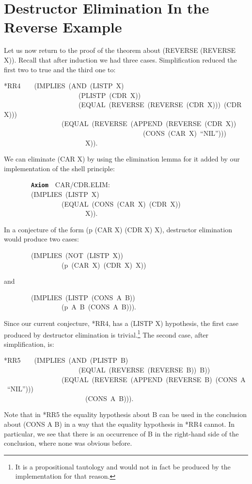 \documentclass[11pt]{book}
\newenvironment{pubasis}{\begin{flushleft}\ttfamily\small}{\normalsize\rmfamily\end{flushleft}}
\newcommand{\axiomordefinition}[1]{\vspace{6pt}\texttt{\textbf{#1}}}
\newcommand{\pubdefaulttextsize}{\large}
\begin{document}
\section{Destructor Elimination In the Reverse Example}
\pubdefaulttextsize
Let us now return to the proof of the theorem about (REVERSE (REVERSE X)).
Recall that after induction we had three cases.  Simplification reduced
the first two to true and the third one to:
\begin{pubasis}
*RR4~~~~(IMPLIES~(AND~(LISTP~X)\\
~~~~~~~~~~~~~~~~~~~~~~(PLISTP~(CDR~X))\\
~~~~~~~~~~~~~~~~~~~~~~(EQUAL~(REVERSE~(REVERSE~(CDR~X)))~(CDR~X)))\\
~~~~~~~~~~~~~~~~~(EQUAL~(REVERSE~(APPEND~(REVERSE~(CDR~X))\\
~~~~~~~~~~~~~~~~~~~~~~~~~~~~~~~~~~~~~~~~~(CONS~(CAR~X)~``NIL'')))\\
~~~~~~~~~~~~~~~~~~~~~~~~X)).\\
\end{pubasis}
We can eliminate (CAR X) by using the elimination lemma
for it added by our implementation of the shell principle:
\begin{pubasis}
~~~~~~~~\axiomordefinition{Axiom}~~CAR/CDR.ELIM:\\
~~~~~~~~(IMPLIES~(LISTP~X)\\
~~~~~~~~~~~~~~~~~(EQUAL~(CONS~(CAR~X)~(CDR~X))\\
~~~~~~~~~~~~~~~~~~~~~~~~X)).\\
\end{pubasis}
In a conjecture of the form (p (CAR X) (CDR X) X), destructor elimination
would produce two cases:
\begin{pubasis}
~~~~~~~~(IMPLIES~(NOT~(LISTP~X))\\
~~~~~~~~~~~~~~~~~(p~(CAR~X)~(CDR~X)~X))\\
\end{pubasis}
and
\begin{pubasis}
~~~~~~~~(IMPLIES~(LISTP~(CONS~A~B))\\
~~~~~~~~~~~~~~~~~(p~A~B~(CONS~A~B))).\\
\end{pubasis}
Since our current conjecture, *RR4, has a (LISTP X) hypothesis, the first
case produced by destructor elimination is trivial.\footnote{It is a propositional tautology and would not in fact be produced by the implementation for that reason.}  The second case, after simplification, is:
\begin{pubasis}
*RR5~~~~(IMPLIES~(AND~(PLISTP~B)\\
~~~~~~~~~~~~~~~~~~~~~~(EQUAL~(REVERSE~(REVERSE~B))~B))\\
~~~~~~~~~~~~~~~~~(EQUAL~(REVERSE~(APPEND~(REVERSE~B)~(CONS~A~``NIL'')))\\
~~~~~~~~~~~~~~~~~~~~~~~~(CONS~A~B))).\\
\end{pubasis}
Note that in *RR5  the equality hypothesis about B can be used in
the conclusion about (CONS A B) in a way that the equality
hypothesis in *RR4 cannot.  In particular, we see that there is an occurrence of B
in the right-hand side of the conclusion, where none was obvious before.
\end{document}
